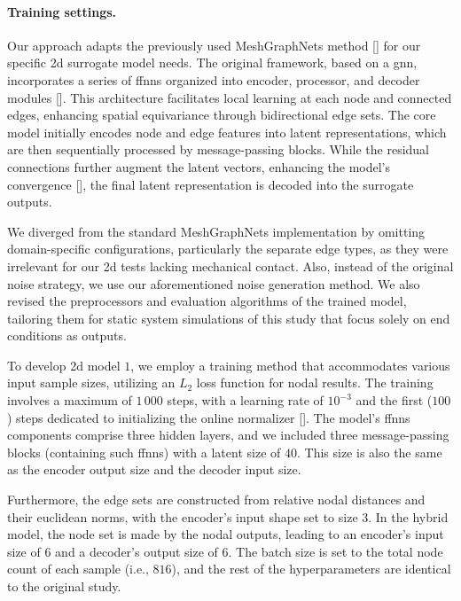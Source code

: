 \paragraph{Training settings.} Our approach adapts the previously used MeshGraphNets method [\cite{pfaff2021}] for our specific \ac{2d} surrogate model needs. The original framework, based on a \ac{gnn}, incorporates a series of \acp{ffnn} organized into encoder, processor, and decoder modules [\cite{sanchez2020,battaglia2018}]. This architecture facilitates local learning at each node and connected edges, enhancing spatial equivariance through bidirectional edge sets. The core model initially encodes node and edge features into latent representations, which are then sequentially processed by message-passing blocks. While the residual connections further augment the latent vectors, enhancing the model's convergence [\cite{sanchez2020}], the final latent representation is decoded into the surrogate outputs.

We diverged from the standard MeshGraphNets implementation by omitting domain-specific configurations, particularly the separate edge types, as they were irrelevant for our \ac{2d} tests lacking mechanical contact. Also, instead of the original noise strategy, we use our aforementioned noise generation method. We also revised the preprocessors and evaluation algorithms of the trained model, tailoring them for static system simulations of this study that focus solely on end conditions as outputs.

To develop \ac{2d} model $1$, we employ a training method that accommodates various input sample sizes, utilizing an $L_2$ loss function for nodal results. The training involves a maximum of $1\,000$ steps, with a learning rate of $10^{-3}$ and the first ($100$) steps dedicated to initializing the online normalizer [\cite{sanchez2020}]. The model's \acp{ffnn} components comprise three hidden layers, and we included three message-passing blocks (containing such \acp{ffnn}) with a latent size of $40$.  This size is also the same as the encoder output size and the decoder input size.

Furthermore, the edge sets are constructed from relative nodal distances and their euclidean norms, with the encoder's input shape set to size $3$. In the hybrid model, the node set is made by the nodal outputs, leading to an encoder's input size of $6$ and a decoder's output size of $6$. The batch size is set to the total node count of each sample (i.e., $816$), and the rest of the hyperparameters are identical to the original study.

